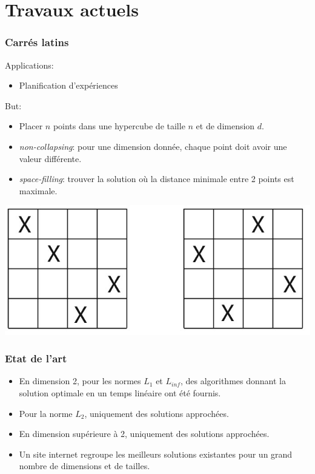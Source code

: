 \documentclass{beamer}
\begin{document}
\section{Travaux actuels}

\begin{frame}
    \frametitle{Carrés latins}
    Applications:
    \begin{itemize}
        \item Planification d'expériences
    \end{itemize}
    But:
    \begin{itemize}
        \item Placer $n$ points dans une hypercube de taille $n$ et de dimension $d$.
        \item \textit{non-collapsing}: pour une dimension donnée, chaque point doit avoir une valeur différente.
        \item \textit{space-filling}: trouver la solution où la distance minimale entre 2 points est maximale.
    \end{itemize}
    \begin{center}
        \includegraphics[scale=0.3]{LHS.jpg}
    \end{center}

\end{frame}

\begin{frame}
    \frametitle{Etat de l'art}
    \begin{itemize}
    \item En dimension 2, pour les normes $L_1$ et $L_{inf}$, des algorithmes donnant la solution optimale en un temps linéaire ont été fournis.
    \item Pour la norme $L_2$, uniquement des solutions approchées.
    \item En dimension supérieure à 2, uniquement des solutions approchées.
    \item Un site internet regroupe les meilleurs solutions existantes pour un grand nombre de dimensions et de tailles.
    \end{itemize}
\end{frame}
\end{document}
